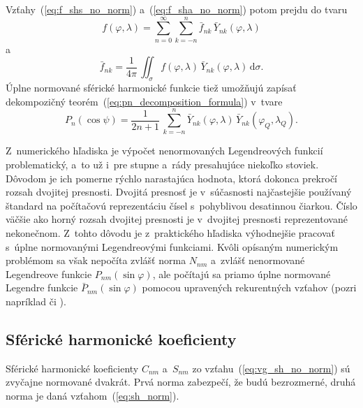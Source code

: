 \documentclass[a4paper, 12pt]{book}
\newcommand{\diff}{\mathrm d}
\begin{document}
Vzťahy~(\ref{eq:f_shs_no_norm}) a~(\ref{eq:f_sha_no_norm}) potom prejdu do 
tvaru
%
\begin{equation}
\label{eq:f_shs}
f(\varphi, \lambda) = \sum_{n = 0}^\infty \sum_{k = -n}^n \bar{f}_{nk} \, 
\bar{Y}_{nk}(\varphi, \lambda)
\end{equation}
%
a
%
\begin{equation}
\label{eq:f_sha}
\bar{f}_{nk} = \frac{1}{4\pi} \, \iint_{\sigma} f(\varphi, \lambda) \, 
\bar{Y}_{nk}(\varphi, \lambda) \, \diff \sigma{.}
\end{equation}
%
Úplne normované sférické harmonické funkcie tiež umožňujú zapísať dekompozičný 
teorém~(\ref{eq:pn_decomposition_formula}) v~tvare 
\citep{MoritzPhysicalGeodesy}
%
\begin{equation}
P_n(\cos\psi) = \frac{1}{2n + 1} \, \sum_{k = -n}^n \bar{Y}_{nk}(\varphi, 
\lambda) \, \bar{Y}_{nk}(\varphi_Q, \lambda_Q){.}
\end{equation}

Z~numerického hľadiska je výpočet nenormovaných Legendreových funkcií 
problematický, a~to už i~pre stupne a~rády presahujúce niekoľko stoviek.  
Dôvodom je ich pomerne rýchlo narastajúca hodnota, ktorá dokonca prekročí 
rozsah dvojitej presnosti.  Dvojitá presnosť je v~súčasnosti najčastejšie 
používaný štandard na počítačovú reprezentáciu čísel s~pohyblivou desatinnou 
čiarkou.  Číslo väčšie ako horný rozsah dvojitej presnosti je v~dvojitej 
presnosti reprezentované nekonečnom.  Z~tohto dôvodu je z~praktického hľadiska 
výhodnejšie pracovať s~úplne normovanými Legendreovými funkciami.  Kvôli 
opísaným numerickým problémom sa však nepočíta zvlášť norma $N_{nm}$ a~zvlášť 
nenormované Legendreove funkcie $P_{nm}(\sin\varphi)$, ale počítajú sa priamo 
úplne normované Legendre funkcie $\bar{P}_{nm}(\sin\varphi)$ pomocou upravených 
rekurentných vzťahov (pozri napríklad \citealt{Holmes2002a} či 
\citealt{Fukushima2012a}).



\subsection{Sférické harmonické koeficienty}

Sférické harmonické koeficienty $C_{nm}$ a~$S_{nm}$ zo 
vzťahu~(\ref{eq:vg_sh_no_norm}) sú zvyčajne normované dvakrát.  Prvá norma 
zabezpečí, že budú bezrozmerné, druhá norma je daná vzťahom~(\ref{eq:sh_norm}).
\end{document}
